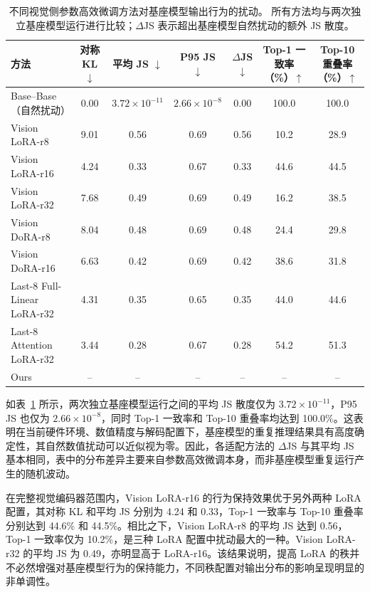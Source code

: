 \documentclass[journal]{IEEEtran}
\begin{document}
\begin{table}[!t]
\centering
\caption{不同视觉侧参数高效微调方法对基座模型输出行为的扰动。
所有方法均与两次独立基座模型运行进行比较；$\Delta$JS 表示超出基座模型自然扰动的额外 JS 散度。}
\label{tab:output_disruption}
\begin{tabular}{lcccccc}
\toprule
方法
& 对称 KL $\downarrow$
& 平均 JS $\downarrow$
& P95 JS $\downarrow$
& $\Delta$JS $\downarrow$
& Top-1 一致率（\%）$\uparrow$
& Top-10 重叠率（\%）$\uparrow$ \\
\midrule
Base--Base（自然扰动）
& 0.00 & $3.72{\times}10^{-11}$ & $2.66{\times}10^{-8}$ & 0.00 & 100.0 & 100.0 \\
\midrule
Vision LoRA-r8
& 9.01 & 0.56 & 0.69 & 0.56 & 10.2 & 28.9 \\
Vision LoRA-r16
& 4.24 & 0.33 & 0.67 & 0.33 & 44.6 & 44.5 \\
Vision LoRA-r32
& 7.68 & 0.49 & 0.69 & 0.49 & 16.2 & 38.5 \\
Vision DoRA-r8
& 8.04 & 0.48 & 0.69 & 0.48 & 24.4 & 29.8 \\
Vision DoRA-r16
& 6.63 & 0.42 & 0.69 & 0.42 & 38.6 & 31.8 \\
Last-8 Full-Linear LoRA-r32
& 4.31 & 0.35 & 0.65 & 0.35 & 44.0 & 44.6 \\
Last-8 Attention LoRA-r32
& 3.44 & 0.28 & 0.67 & 0.28 & 54.2 & 51.3 \\
\midrule
Ours
& -- & -- & -- & -- & -- & -- \\
\bottomrule
\end{tabular}
\end{table}

如表~\ref{tab:output_disruption} 所示，两次独立基座模型运行之间的平均 JS 散度仅为 $3.72{\times}10^{-11}$，P95 JS 也仅为 $2.66{\times}10^{-8}$，同时 Top-1 一致率和 Top-10 重叠率均达到 100.0\%。这表明在当前硬件环境、数值精度与解码配置下，基座模型的重复推理结果具有高度确定性，其自然数值扰动可以近似视为零。因此，各适配方法的 $\Delta$JS 与其平均 JS 基本相同，表中的分布差异主要来自参数高效微调本身，而非基座模型重复运行产生的随机波动。

在完整视觉编码器范围内，Vision LoRA-r16 的行为保持效果优于另外两种 LoRA 配置，其对称 KL 和平均 JS 分别为 4.24 和 0.33，Top-1 一致率与 Top-10 重叠率分别达到 44.6\% 和 44.5\%。相比之下，Vision LoRA-r8 的平均 JS 达到 0.56，Top-1 一致率仅为 10.2\%，是三种 LoRA 配置中扰动最大的一种。Vision LoRA-r32 的平均 JS 为 0.49，亦明显高于 LoRA-r16。该结果说明，提高 LoRA 的秩并不必然增强对基座模型行为的保持能力，不同秩配置对输出分布的影响呈现明显的非单调性。
\end{document}
